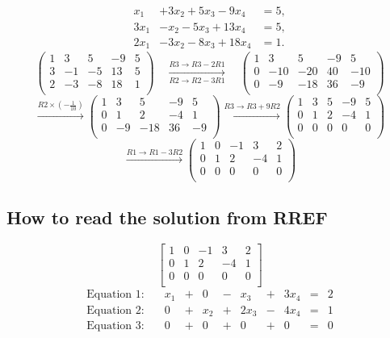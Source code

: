 \documentclass[12pt]{article}
\theoremstyle{definition}
\theoremstyle{plain}
\begin{document}
\begin{examplebox}

\[
\boxed{
\begin{aligned}
x_1 &+ 3x_2 + 5x_3 - 9x_4 &= 5,\\
3x_1 &- x_2 - 5x_3 + 13x_4 &= 5,\\
2x_1 &- 3x_2 - 8x_3 + 18x_4 &= 1.
\end{aligned}
}
\]
\[ \]
\[
\left(\!
\begin{array}{rrrr|r}
1 & 3 & 5 & -9 & 5\\
3 & -1 & -5 & 13 & 5\\
2 & -3 & -8 & 18 & 1\\
\end{array}
\!\right)
\quad\xrightarrow[R2 \to R2 - 3R1]{R3 \to R3 - 2R1}\quad
\left(\!
\begin{array}{rrrr|r}
1 & 3 & 5 & -9 & 5\\
0 & -10 & -20 & 40 & -10\\
0 & -9 & -18 & 36 & -9\\
\end{array}
\!\right)
\]
\[ \]
\[
\xrightarrow{R2 \times \left(-\tfrac{1}{10}\right)}
\left(\!
\begin{array}{rrrr|r}
1 & 3 & 5 & -9 & 5\\
0 & 1 & 2 & -4 & 1\\
0 & -9 & -18 & 36 & -9\\
\end{array}
\!\right)
\xrightarrow{R3 \to R3 + 9R2}
\left(\!
\begin{array}{rrrr|r}
1 & 3 & 5 & -9 & 5\\
0 & 1 & 2 & -4 & 1\\
0 & 0 & 0 & 0 & 0\\
\end{array}
\!\right)
\]
\[ \]
\[
\xrightarrow{R1 \to R1 - 3R2}
\left(\!
\begin{array}{rrrr|r}
1 & 0 & -1 & 3 & 2\\
0 & 1 & 2 & -4 & 1\\
0 & 0 & 0 & 0 & 0\\
\end{array}
\!\right)
\]

\end{examplebox}
\newpage
\subsection{How to read the solution from RREF}
\[
  \left[\!
\begin{array}{rrrr|r}
  1 & 0 & -1 & 3 & 2\\
  0 & 1 & 2 & -4 & 1\\
  0 & 0 & 0 & 0 & 0\\
  \end{array}
  \!\right]
\]
\[
\begin{array}{cccccccccccc}
  \text{Equation 1:}& \quad x_1 &+& 0 &-& x_3 &+& 3x_4 &=& 2\\
  \text{Equation 2:}& \quad 0 &+& x_2 &+& 2x_3 &-& 4x_4 &=& 1\\
  \text{Equation 3:}& \quad 0 &+& 0 &+& 0 &+& 0  &=& 0\\
\end{array}
\]
\end{document}
